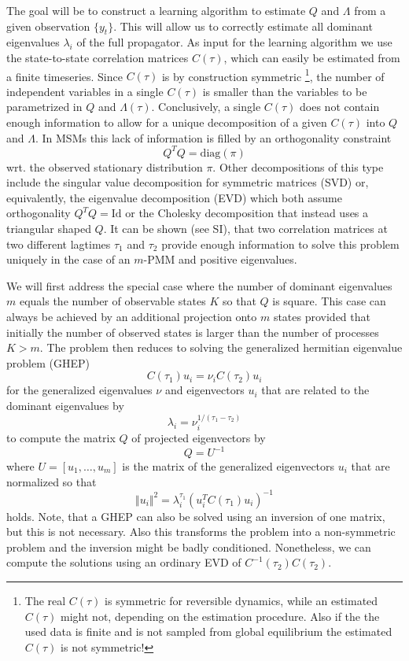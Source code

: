 \documentclass[aps,pre,twocolumn,nofootinbib,superscriptaddress,linenumbers]{revtex4-1}
\begin{document}
The goal will be to construct a learning algorithm to estimate $Q$
and $\Lambda$ from a given observation $\{y_{t}\}$. This will allow
us to correctly estimate all dominant eigenvalues $\lambda_{i}$ of
the full propagator. As input for the learning algorithm we use the
state-to-state correlation matrices $C(\tau)$, which can easily be
estimated from a finite timeseries. Since $C(\tau)$ is by construction
symmetric %
\footnote{The real $C(\tau)$ is symmetric for reversible dynamics, while an
estimated $C(\tau)$ might not, depending on the estimation procedure.
Also if the the used data is finite and is not sampled from global
equilibrium the estimated $C(\tau)$ is not symmetric!%
}, the number of independent variables in a single $C(\tau)$ is smaller
than the variables to be parametrized in $Q$ and $\Lambda(\tau)$.
Conclusively, a single $C(\tau)$ does not contain enough information
to allow for a unique decomposition of a given $C(\tau)$ into $Q$
and $\Lambda$. In MSMs this lack of information is filled by an orthogonality
constraint 
\[
Q^{T}Q=\text{diag}(\pi)
\]
wrt. the observed stationary distribution $\pi$. Other decompositions
of this type include the singular value decomposition for symmetric
matrices (SVD) or, equivalently, the eigenvalue decomposition (EVD)
which both assume orthogonality $Q^{T}Q=\text{Id}$ or the Cholesky
decomposition that instead uses a triangular shaped $Q$. It can be
shown (see SI), that two correlation matrices at two different lagtimes
$\tau_{1}$ and $\tau_{2}$ provide enough information to solve this
problem uniquely in the case of an $m$-PMM and positive eigenvalues.

We will first address the special case where the number of dominant
eigenvalues~$m$ equals the number of observable states $K$ so that
$Q$ is square. This case can always be achieved by an additional
projection onto $m$ states provided that initially the number of
observed states is larger than the number of processes $K>m$. The
problem then reduces to solving the generalized hermitian eigenvalue
problem (GHEP)
\[
C(\tau_{1})u_{i}=\nu_{i}C(\tau_{2})u_{i}
\]
for the generalized eigenvalues $\nu$ and eigenvectors $u_{i}$ that
are related to the dominant eigenvalues by
\[
\lambda_{i}=\nu_{i}^{1/(\tau_{1}-\tau_{2})}
\]
to compute the matrix $Q$ of projected eigenvectors by
\[
Q=U^{-1}
\]
where $U=[u_{1},\ldots,u_{m}]$ is the matrix of the generalized eigenvectors
$u_{i}$ that are normalized so that 
\[
\Vert u_{i}\Vert^{2}=\lambda_{i}^{\tau_{1}}\left(u_{i}^{T}C(\tau_{1})u_{i}\right)^{-1}
\]
holds. Note, that a GHEP can also be solved using an inversion of
one matrix, but this is not necessary. Also this transforms the problem
into a non-symmetric problem and the inversion might be badly conditioned.
Nonetheless, we can compute the solutions using an ordinary EVD of
$C^{-1}(\tau_{2})C(\tau_{2})$. 
\end{document}
